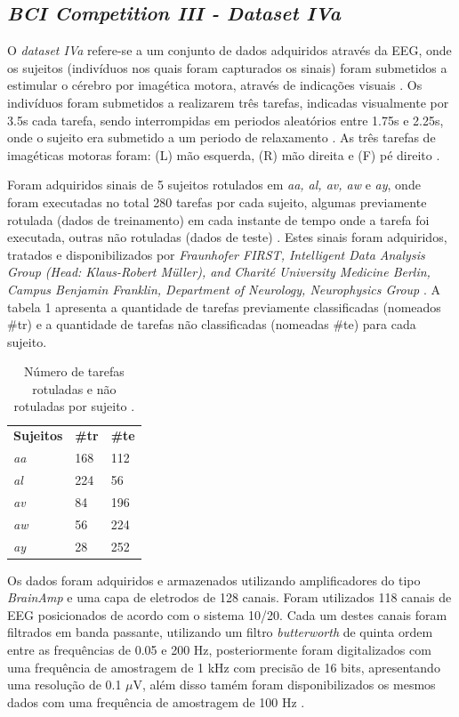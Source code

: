 \subsection{\textit{BCI Competition III - Dataset IVa}}
O \textit{dataset IVa} refere-se a um conjunto de dados adquiridos através da EEG, onde os sujeitos (indivíduos nos quais foram capturados os sinais) foram submetidos a estimular o cérebro por imagética motora, através de indicações visuais \cite{BCICompetition}. Os indivíduos foram submetidos a realizarem três tarefas, indicadas visualmente por 3.5s cada tarefa, sendo interrompidas em periodos aleatórios entre 1.75s e 2.25s, onde o sujeito era submetido a um periodo de relaxamento \cite{BCICompetition}. As três tarefas de imagéticas motoras foram: (L) mão esquerda, (R) mão direita e (F) pé direito \cite{BCICompetition}.

Foram adquiridos sinais de 5 sujeitos rotulados em \textit{aa, al, av, aw} e \textit{ay}, onde foram executadas no total 280 tarefas por cada sujeito, algumas previamente rotulada (dados de treinamento) em cada instante de tempo onde a tarefa foi executada, outras não rotuladas (dados de teste) \cite{siteBCI}. Estes sinais foram adquiridos, tratados e disponibilizados por \textit{Fraunhofer FIRST, Intelligent Data Analysis Group (Head: Klaus-Robert Müller), and Charité University Medicine Berlin, Campus Benjamin Franklin, Department of Neurology, Neurophysics Group} \cite{BCICompetition}. A tabela 1 apresenta a quantidade de tarefas previamente classificadas (nomeados \#tr) e a quantidade de tarefas não classificadas (nomeadas \#te) para cada sujeito.

\begin{table}[h!]
	\centering
	\caption{Número de tarefas rotuladas e não rotuladas por sujeito \cite{BCICompetition}.}
	\label{my-label}
	\begin{tabular}{lll}
		\textbf{Sujeitos} & \textbf{\#tr} & \textbf{\#te} \\
		\textit{aa} & 168 & 112 \\
		\textit{al} & 224 & 56 \\
		\textit{av} & 84 & 196 \\
		\textit{aw} & 56 & 224 \\
		\textit{ay} & 28 & 252
	\end{tabular}
\end{table}

Os dados foram adquiridos e armazenados utilizando amplificadores do tipo \textit{BrainAmp} e uma capa de eletrodos de 128 canais. Foram utilizados 118 canais de EEG posicionados de acordo com o sistema 10/20. Cada um destes canais foram filtrados em banda passante, utilizando um filtro \textit{butterworth} de quinta ordem entre as frequências de 0.05 e 200 Hz, posteriormente foram digitalizados com uma frequência de amostragem de 1 kHz com precisão de 16 bits, apresentando uma resolução de 0.1 $\mu$V, além disso tamém foram disponibilizados os mesmos dados com uma frequência de amostragem de 100 Hz \cite{siteBCI}.
 
